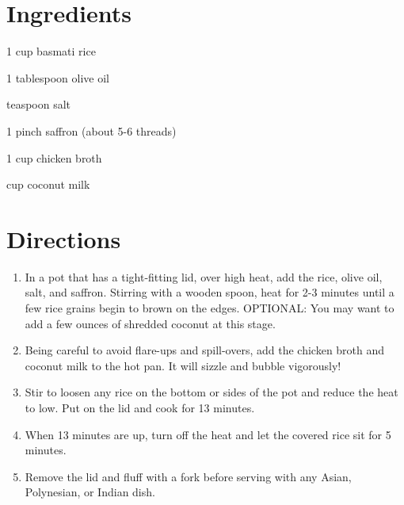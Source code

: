 \section*{Ingredients}
\begin{ingredients-list}
	\item 1 cup basmati rice
	\item 1 tablespoon olive oil
	\item {} teaspoon salt
	\item 1 pinch saffron (about 5-6 threads)
	\item 1 cup chicken broth
	\item {} cup coconut milk
\end{ingredients-list}

\section*{Directions}
\begin{enumerate}
	\item In a pot that has a tight-fitting lid, over high heat, add the rice, olive oil, salt, and saffron.
		Stirring with a wooden spoon, heat for 2-3 minutes until a few rice grains begin to brown on the edges.
		OPTIONAL: You may want to add a few ounces of shredded coconut at this stage.
	\item Being careful to avoid flare-ups and spill-overs, add the chicken broth and coconut milk to the hot pan. It will sizzle and bubble vigorously!
	\item  Stir to loosen any rice on the bottom or sides of the pot and reduce the heat to low. Put on the lid and cook for 13 minutes.
	\item  When 13 minutes are up, turn off the heat and let the covered rice sit for 5 minutes.
	\item Remove the lid and fluff with a fork before serving with any Asian, Polynesian, or Indian dish.
\end{enumerate}


